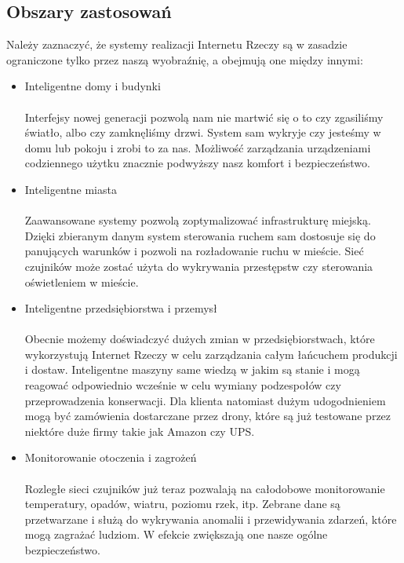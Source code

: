 \documentclass[12pt]{report}
\let\Oldsubsection\subsection
\renewcommand{\subsection}{\FloatBarrier\Oldsubsection}
\begin{document}
\subsection{Obszary zastosowań}
Należy zaznaczyć, że systemy realizacji Internetu Rzeczy są w zasadzie ograniczone tylko przez naszą wyobraźnię, a obejmują one między innymi:
\begin{itemize}
	\item Inteligentne domy i budynki \\ \\
	Interfejsy nowej generacji pozwolą nam nie martwić się o to czy zgasiliśmy światło, albo czy zamknęliśmy drzwi. System sam wykryje czy jesteśmy w domu lub pokoju i zrobi to za nas. Możliwość zarządzania urządzeniami codziennego użytku znacznie podwyższy nasz komfort i bezpieczeństwo.
	\item Inteligentne miasta \\ \\
	Zaawansowane systemy pozwolą zoptymalizować infrastrukturę miejską. Dzię\-ki zbieranym danym system sterowania ruchem sam dostosuje się do panujących warunków i pozwoli na rozładowanie ruchu w mieście. Sieć czujników może zostać użyta do wykrywania przestępstw czy sterowania oświetleniem w mieście.
	\item Inteligentne przedsiębiorstwa i przemysł \\ \\
	Obecnie możemy doświadczyć dużych zmian w przedsiębiorstwach, które wykorzystują Internet Rzeczy w celu zarządzania całym łańcuchem produkcji i dostaw. Inteligentne maszyny same wiedzą w jakim są stanie i mogą reagować odpowiednio wcześnie w celu wymiany podzespołów czy przeprowadzenia konserwacji. Dla klienta natomiast dużym udogodnieniem mogą być zamówienia dostarczane przez drony, które są już testowane przez niektóre duże firmy takie jak Amazon czy UPS.
	\item Monitorowanie otoczenia i zagrożeń \\ \\
	Rozległe sieci czujników już teraz pozwalają na całodobowe monitorowanie temperatury, opadów, wiatru, poziomu rzek, itp. Zebrane dane są przetwarzane i służą do wykrywania anomalii i przewidywania zdarzeń, które mogą zagrażać ludziom. W efekcie zwiększają one nasze ogólne bezpieczeństwo.
\end{itemize}
\end{document}
